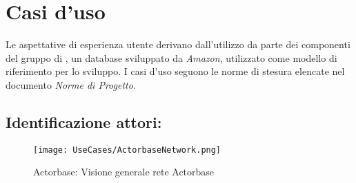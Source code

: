 \documentclass{scalatekids-article}
\begin{document}
\section{Casi d'uso}
Le aspettative di esperienza utente derivano dall'utilizzo da parte dei
componenti del gruppo di , un database 
sviluppato da \textit{Amazon}, utilizzato come modello di riferimento per lo
sviluppo. I casi d'uso seguono le norme di stesura elencate nel documento \textit{Norme di Progetto}.%
\subsection{Identificazione attori:}
\begin{figure}[H]
  \begin{center}
    \texttt{[image: UseCases/ActorbaseNetwork.png]}
    \caption{Actorbase: Visione generale rete Actorbase}
  \end{center}
\end{figure}
\end{document}
